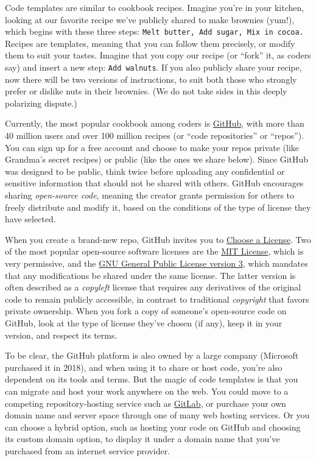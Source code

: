 \documentclass[
  english,
]{book}
\begin{document}
Code templates are similar to cookbook recipes. Imagine you're in your kitchen, looking at our favorite recipe we've publicly shared to make brownies (yum!), which begins with these three steps: \texttt{Melt\ butter,\ Add\ sugar,\ Mix\ in\ cocoa.} Recipes are templates, meaning that you can follow them precisely, or modify them to suit your tastes. Imagine that you copy our recipe (or ``fork'' it, as coders say) and insert a new step: \texttt{Add\ walnuts}. If you also publicly share your recipe, now there will be two versions of instructions, to suit both those who strongly prefer or dislike nuts in their brownies. (We do not take sides in this deeply polarizing dispute.)

Currently, the most popular cookbook among coders is \href{https://github.com}{GitHub}, with more than 40 million users and over 100 million recipes (or ``code repositories'' or ``repos''). You can sign up for a free account and choose to make your repos private (like Grandma's secret recipes) or public (like the ones we share below). Since GitHub was designed to be public, think twice before uploading any confidential or sensitive information that should not be shared with others. GitHub encourages sharing \emph{open-source code}, meaning the creator grants permission for others to freely distribute and modify it, based on the conditions of the type of license they have selected.

When you create a brand-new repo, GitHub invites you to \href{https://choosealicense.com/}{Choose a License}. Two of the most popular open-source software licenses are the \href{https://choosealicense.com/licenses/mit/}{MIT License}, which is very permissive, and the \href{https://choosealicense.com/licenses/gpl-3.0/}{GNU General Public License version 3}, which mandates that any modifications be shared under the same license. The latter version is often described as a \emph{copyleft} license that requires any derivatives of the original code to remain publicly accessible, in contrast to traditional \emph{copyright} that favors private ownership. When you fork a copy of someone's open-source code on GitHub, look at the type of license they've chosen (if any), keep it in your version, and respect its terms.

To be clear, the GitHub platform is also owned by a large company (Microsoft purchased it in 2018), and when using it to share or host code, you're also dependent on its tools and terms. But the magic of code templates is that you can migrate and host your work anywhere on the web. You could move to a competing repository-hosting service such as \href{https://gitlab.com}{GitLab}, or purchase your own domain name and server space through one of many web hosting services. Or you can choose a hybrid option, such as hosting your code on GitHub and choosing its custom domain option, to display it under a domain name that you've purchased from an internet service provider.
\end{document}
